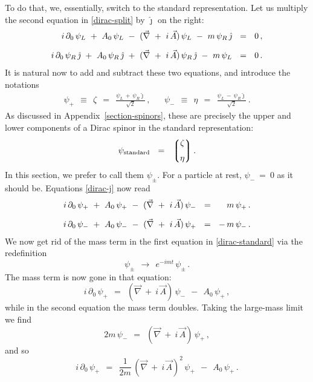 \documentclass[epsfig,12pt]{article}
\newcommand{\p}{\partial}
\newcommand{\lgr}{\left\lgroup}
\newcommand{\rgr}{\right\rgroup}
\newcommand{\jj}{\hat\jmath}
\begin{document}
	To do that, we, essentially, switch to the standard representation.
	Let us multiply the second equation in \eqref{dirac-split} by $ \jj $
	on the right:
\begin{align}
%
\notag
	i\,\p_0\,\psi_L  ~+~  A_0\,\psi_L  ~-~  (\vec\nabla ~+~ i\,\vec A)\,\psi_L
	~-~  m\, \psi_R\, \jj	& ~~=~~	0\,,
	\\[2mm]
%
\label{dirac-j}
	i\,\p_0\,\psi_R\,\jj  ~+~  A_0\,\psi_R\,\jj  ~+~  (\vec\nabla ~+~ i\,\vec A)\,\psi_R\,\jj
	~-~  m\, \psi_L  & ~~=~~ 0\,.
\end{align}
	It is natural now to add and subtract these two equations, and introduce the notations
\begin{align}
	\psi_+		~~\equiv~~	\zeta	~~=~~	\frac{\psi_L \,+\, \psi_R \jj}{\sqrt{2}}\,,
	&&
	\psi_-		~~\equiv~~	\eta	~~=~~	\frac{\psi_L \,-\, \psi_R \jj}{\sqrt{2}}\,.
\label{standard}
\end{align}
	As discussed in Appendix~\ref{section-spinors}, these are precisely the upper
	and lower components of a Dirac spinor in the standard representation:
\begin{equation}
	\psi_\text{standard}	~~=~~	
		\lgr 
			\begin{matrix}
				\zeta	\\[2mm]
				\eta
			\end{matrix}
		\rgr.
\end{equation}
	In this section, we prefer to call them $ \psi_\pm $.
	For a particle at rest, $ \psi_- ~=~ 0 $ as it should be.
	Equations \eqref{dirac-j} now read
\begin{align}
%
\notag
	i\,\p_0\,\psi_+  ~+~  A_0\, \psi_+  ~-~  (\vec\nabla ~+~  i\,\vec A)\, \psi_-	& ~~=~~  \phantom{+}\,m\,\psi_+\,.
	\\[2mm]
\label{dirac-standard}
	i\,\p_0\,\psi_-  ~+~  A_0\, \psi_-  ~-~  (\vec\nabla ~+~  i\,\vec A)\,\psi_+	& ~~=~~ -\,m\,\psi_-\,.
\end{align}
	We now get rid of the mass term in the first equation in \eqref{dirac-standard} via the redefinition
\[
	\psi_\pm	~~\to~~		e^{-i m t}\, \psi_\pm\,.
\]
	The mass term is now gone in that equation:
\begin{equation}
	i\,\p_0\,\psi_+		~~=~~	(\vec\nabla ~+~ i\,\vec A)\,\psi_-  ~~-~~  A_0\, \psi_+\,,
\end{equation}
	while in the second equation the mass term doubles.
	Taking the large-mass limit we find
\[
	2m\,\psi_-	~~=~~	(\vec\nabla ~+~ i\,\vec A)\,\psi_+\,,
\]
	and so
\begin{equation}
	i\,\p_0\,\psi_+		~~=~~
		\frac 1 {2m}\, (\vec\nabla ~+~ i\,\vec A)^2\, \psi_+  ~~-~~  A_0\, \psi_+\,.
\end{equation}
\end{document}

